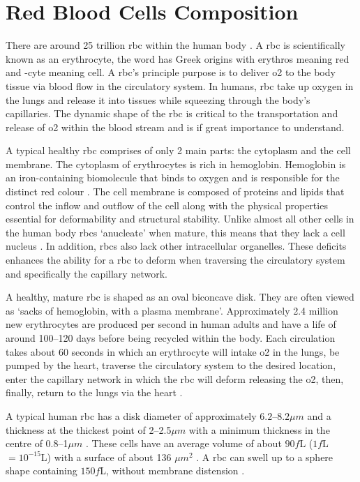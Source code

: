 \section{Red Blood Cells Composition} \label{Sect.Blood}


\noindent There are around 25 trillion \ac{rbc} within the human body \cite{Cimen2008}. A \acf{rbc} is scientifically known as an erythrocyte, the word has Greek origins with erythros meaning red and -cyte meaning cell. A \ac{rbc}'s principle purpose is to deliver \ac{o2} to the body tissue via blood flow in the circulatory system. In humans, \ac{rbc} take up oxygen in the lungs and release it into tissues while squeezing through the body's capillaries. The dynamic shape of the \ac{rbc} is critical to the transportation and release of \ac{o2} within the blood stream and is if great importance to understand.

A typical healthy \ac{rbc} comprises of only 2 main parts: the cytoplasm and the cell membrane. The cytoplasm of erythrocytes is rich in hemoglobin. Hemoglobin is an iron-containing biomolecule that binds to oxygen and is responsible for the distinct red colour \cite{Shape2010}. The cell membrane is composed of proteins and lipids that control the inflow and outflow of the cell along with the physical properties essential for deformability and structural stability. Unlike almost all other cells in the human body \ac{rbc}s `anucleate' when mature, this means that they lack a cell nucleus \cite{redblood2009}. In addition, \ac{rbc}s also lack other intracellular organelles. These deficits enhances the ability for a \ac{rbc} to deform when traversing the circulatory system and specifically the capillary network.


A healthy, mature  \ac{rbc} is shaped as an oval biconcave disk. They are often viewed as `sacks of hemoglobin, with a plasma membrane'. Approximately 2.4 million new erythrocytes are produced per second in human adults \cite{Minasyan2014} and have a life of around 100–120 days \cite{Minasyan2014, Kim1979} before being recycled within the body. Each circulation takes about 60 seconds in which an erythrocyte will intake \ac{o2} in the lungs, be pumped by the heart, traverse the circulatory system to the desired location, enter the capillary network in which the \ac{rbc} will deform releasing the \ac{o2}, then, finally, return to the lungs via the heart \cite{Minasyan2014, Kim1979}. 

A typical human \ac{rbc} has a disk diameter of approximately $6.2–8.2 \mu m$ \cite{Shape2010} and a thickness at the thickest point of 2–2.5$\mu m$ with a minimum thickness in the centre of 0.8–1$\mu m$ \cite{Shape2010}. These cells have an average volume of about $90 f$L ($1f$L$ = 10^{-15}$L) with a surface of about 136 $\mu m^2$ \cite{Shape2010}. A \ac{rbc} can swell up to a sphere shape containing $150 f$L, without membrane distension \cite{Minasyan2014}.


